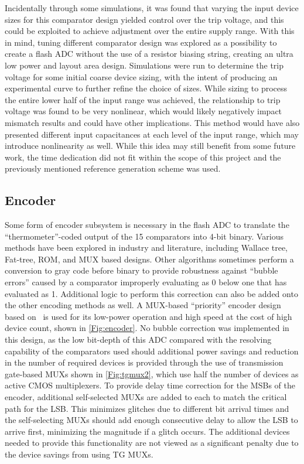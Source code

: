 \documentclass[11pt,letterpaper]{article}
\begin{document}
Incidentally through some simulations, it was found that varying the input device sizes for this comparator design yielded control over the trip voltage, and this could be exploited to achieve adjustment over the entire supply range. With this in mind, tuning different comparator design was explored as a possibility to create a flash ADC without the use of a resistor biasing string, creating an ultra low power and layout area design. Simulations were run to determine the trip voltage for some initial coarse device sizing, with the intent of producing an experimental curve to further refine the choice of sizes. While sizing to process the entire lower half of the input range was achieved, the relationship to trip voltage was found to be very nonlinear, which would likely negatively impact mismatch results and could have other implications. This method would have also presented different input capacitances at each level of the input range, which may introduce nonlinearity as well. While this idea may still benefit from some future work, the time dedication did not fit within the scope of this project and the previously mentioned reference generation scheme was used.

\subsection{Encoder}

Some form of encoder subsystem is necessary in the flash ADC to translate the ``thermometer''-coded output of the 15 comparators into 4-bit binary. Various methods have been explored in industry and literature, including Wallace tree, Fat-tree, ROM, and MUX based designs. Other algorithms sometimes perform a conversion to gray code before binary to provide robustness against ``bubble errors'' caused by a comparator improperly evaluating as 0 below one that has evaluated as 1. Additional logic to perform this correction can also be added onto the other encoding methods as well. A MUX-based ``priority'' encoder design based on~\cite{Sall2007} is used for its low-power operation and high speed at the cost of high device count, shown in \cref{Fig:encoder}. No bubble correction was implemented in this design, as the low bit-depth of this ADC compared with the resolving capability of the comparators used should additional power savings and reduction in the number of required devices is provided through the use of transmission gate-based MUXs shown in \cref{Fig:tgmux2}, which use half the number of devices as active CMOS multiplexers. To provide delay time correction for the MSBs of the encoder, additional self-selected MUXs are added to each to match the critical path for the LSB\@. This minimizes glitches due to different bit arrival times and the self-selecting MUXs should add enough consecutive delay to allow the LSB to arrive first, minimizing the magnitude if a glitch occurs. The additional devices needed to provide this functionality are not viewed as a significant penalty due to the device savings from using TG MUXs. 
\end{document}
